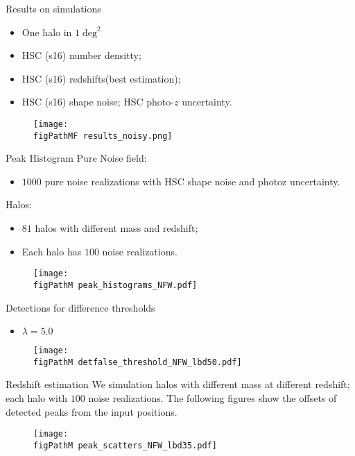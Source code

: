 \begin{frame}{Results on simulations}
\begin{itemize}
    \item One halo in $1\deg^2$
    \item HSC (s16) number densitty;
    \item HSC (s16) redshifts(best estimation);
    \item HSC (s16) shape noise; HSC photo-$z$ uncertainty.
\end{itemize}
\begin{figure}
\centering
\texttt{[image: \\figPathMF results\_noisy.png]}
\end{figure}
\end{frame}

\begin{frame}{Peak Histogram}
Pure Noise field:
\begin{itemize}
    \item $1000$ pure noise realizations with HSC shape noise and photoz
    uncertainty.
\end{itemize}
Halos:
\begin{itemize}
    \item $81$ halos with different mass and redshift;
    \item Each halo has $100$ noise realizations.
\end{itemize}
\begin{figure}
\centering
\texttt{[image: \\figPathM peak\_histograms\_NFW.pdf]}
\end{figure}
\end{frame}

\begin{frame}{Detections for difference thresholds}
    \begin{itemize}
        \item $\lambda=5.0$
    \end{itemize}
\begin{figure}
\centering
\texttt{[image: \\figPathM detfalse\_threshold\_NFW\_lbd50.pdf]}
\end{figure}
\end{frame}
\begin{frame}{Redshift estimation}
    We simulation halos with different mass at different redshift; each halo with $100$ noise realizations. The following figures show the \alert{offsets} of detected peaks from the input positions.
\begin{figure}
\centering
\texttt{[image: \\figPathM peak\_scatters\_NFW\_lbd35.pdf]}
\end{figure}
\end{frame}


